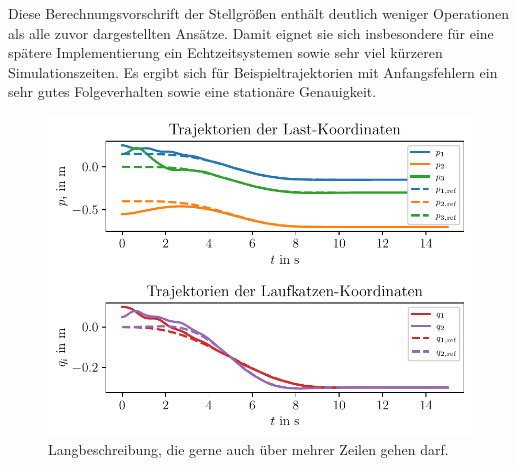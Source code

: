 Diese Berechnungsvorschrift der Stellgrößen enthält deutlich weniger Operationen als alle zuvor dargestellten Ansätze. Damit eignet sie sich insbesondere für eine spätere Implementierung ein Echtzeitsystemen sowie sehr viel kürzeren Simulationszeiten. Es ergibt sich für Beispieltrajektorien mit Anfangsfehlern ein sehr gutes Folgeverhalten sowie eine stationäre Genauigkeit.

\begin{figure}[ht]
	\begin{center}
		\includegraphics[scale=1]{Pictures/feedforward_lin_selec_controller_initial_error}
	\end{center}
	\caption[Kurzbeschreibung für Abbildungsverzeichnis]
	{Langbeschreibung, die gerne auch über mehrer Zeilen gehen darf.}
	\label{fig_feedforward_selec_controller_initial_error}
\end{figure}

